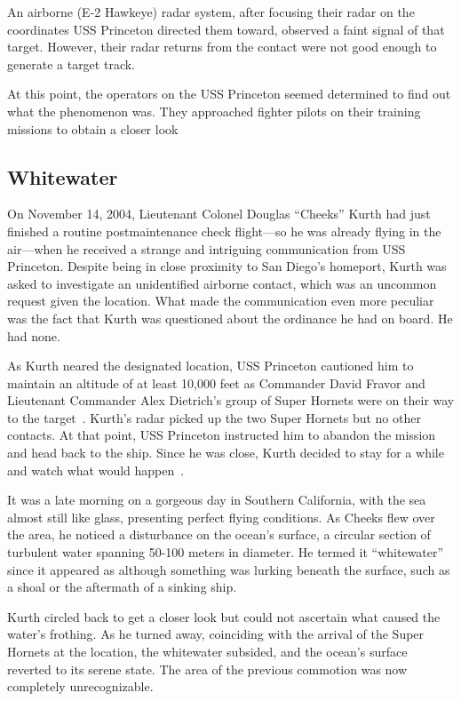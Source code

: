 An airborne (E-2 Hawkeye) radar system, after focusing their radar on the coordinates USS Princeton directed them toward,
observed a faint signal of that target.
However, their radar returns from the contact were not good enough to generate a target track.

At this point, the operators on the USS Princeton seemed determined to find out what the phenomenon was. They approached fighter pilots on their training missions to obtain a closer look

\subsection{Whitewater}

On November 14, 2004, Lieutenant Colonel Douglas ``Cheeks'' Kurth had just finished a routine postmaintenance check flight---so he was already flying in the air---when
he received a strange and intriguing communication from USS Princeton.
Despite being in close proximity to San Diego's homeport, Kurth was asked to investigate an unidentified airborne contact,
which was an uncommon request given the location.
What made the communication even more peculiar was the fact that Kurth was questioned about the ordinance he had on board.
He had none.

As Kurth neared the designated location, USS Princeton cautioned him to maintain an altitude of at least 10,000 feet
as Commander David Fravor and Lieutenant Commander Alex Dietrich's group of Super Hornets
were on their way to the target~\cite{Dietrich-TicTac}.
Kurth's radar picked up the two Super Hornets but no other contacts.
At that point, USS Princeton instructed him to abandon the mission and head back to the ship.
Since he was close, Kurth decided to stay for a while and watch what would happen~\cite{Chierici2015Mar}.

It was a late morning on a gorgeous day in Southern California, with the sea almost still like glass, presenting perfect flying conditions. As Cheeks flew over the area, he noticed a disturbance on the ocean's surface, a circular section of turbulent water spanning 50-100 meters in diameter. He termed it ``whitewater'' since it appeared as although something was lurking beneath the surface, such as a shoal or the aftermath of a sinking ship.

Kurth circled back to get a closer look but could not ascertain what caused the water's frothing.
As he turned away, coinciding with the arrival of the Super Hornets at the location,
the whitewater subsided, and the ocean's surface reverted to its serene state.
The area of the previous commotion was now completely unrecognizable.

